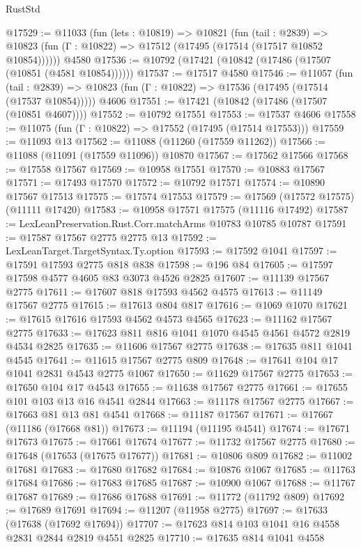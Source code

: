 \begin{lexlean}{RustStd}
\begin{coremodule}
@17529 := @11033
    (fun (lets : @10819) =>
    @10821
      (fun (tail : @2839) =>
      @10823 (fun (Γ : @10822) => @17512 (@17495 (@17514 (@17517 @10852 @10854))))))
    @4580
@17536 := @10792 (@17421 (@10842 (@17486 (@17507 (@10851 (@4581 @10854))))))
@17537 := @17517 @4580
@17546 := @11057
    (fun (tail : @2839) => @10823 (fun (Γ : @10822) => @17536 (@17495 (@17514 (@17537 @10854)))))
    @4606
@17551 := @17421 (@10842 (@17486 (@17507 (@10851 @4607))))
@17552 := @10792 @17551
@17553 := @17537 @4606
@17558 := @11075 (fun (Γ : @10822) => @17552 (@17495 (@17514 @17553)))
@17559 := @11093 @13
@17562 := @11088 (@11260 (@17559 @11262))
@17566 := @11088 (@11091 (@17559 @11096)) @10870
@17567 := @17562 @17566
@17568 := @17558 @17567
@17569 := @10958 @17551
@17570 := @10883 @17567
@17571 := @17493 @17570
@17572 := @10792 @17571
@17574 := @10890 @17567 @17513
@17575 := @17574 @17553
@17579 := @17569 (@17572 @17575) (@11111 @17420)
@17583 := @10958 @17571 @17575 (@11116 @17492)
@17587 := LexLeanPreservation.Rust.Corr.matchArms @10783 @10785 @10787
@17591 := @17587 @17567 @2775 @2775 @13
@17592 := LexLeanTarget.TargetSyntax.Ty.option
@17593 := @17592 @1041
@17597 := @17591 @17593 @2775 @818 @838
@17598 := @196 @84
@17605 := @17597 @17598 @4577 @4605 @83 @3073 @4526 @2825
@17607 := @11139 @17567 @2775
@17611 := @17607 @818 @17593 @4562 @4575
@17613 := @11149 @17567 @2775
@17615 := @17613 @804 @817
@17616 := @1069 @1070
@17621 := @17615 @17616 @17593 @4562 @4573 @4565
@17623 := @11162 @17567 @2775
@17633 := @17623 @811 @816 @1041 @1070 @4545 @4561 @4572 @2819 @4534 @2825
@17635 := @11606 @17567 @2775
@17638 := @17635 @811 @1041 @4545
@17641 := @11615 @17567 @2775 @809
@17648 := @17641 @104 @17 @1041 @2831 @4543 @2775 @1067
@17650 := @11629 @17567 @2775
@17653 := @17650 @104 @17 @4543
@17655 := @11638 @17567 @2775
@17661 := @17655 @101 @103 @13 @16 @4541 @2844
@17663 := @11178 @17567 @2775
@17667 := @17663 @81 @13 @81 @4541
@17668 := @11187 @17567
@17671 := @17667 (@11186 (@17668 @81))
@17673 := @11194 (@11195 @4541)
@17674 := @17671 @17673
@17675 := @17661 @17674
@17677 := @11732 @17567 @2775
@17680 := @17648 (@17653 (@17675 @17677))
@17681 := @10806 @809
@17682 := @11002 @17681
@17683 := @17680 @17682
@17684 := @10876 @1067
@17685 := @11763 @17684
@17686 := @17683 @17685
@17687 := @10900 @1067
@17688 := @11767 @17687
@17689 := @17686 @17688
@17691 := @11772 (@11792 @809)
@17692 := @17689 @17691
@17694 := @11207 (@11958 @2775)
@17697 := @17633 (@17638 (@17692 @17694))
@17707 := @17623 @814 @103 @1041 @16 @4558 @2831 @2844 @2819 @4551 @2825
@17710 := @17635 @814 @1041 @4558

\end{coremodule}
\end{lexlean}

